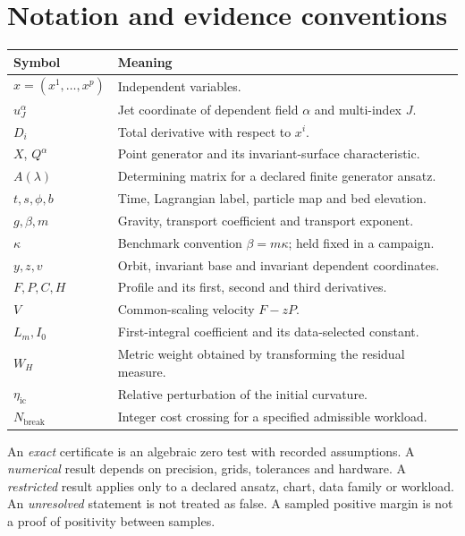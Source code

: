 \documentclass[12pt,a4paper,oneside]{report}
\numberwithin{equation}{chapter}
\begin{document}
\chapter*{Notation and evidence conventions}
\begin{longtable}{p{}p{}}
\toprule
Symbol & Meaning\\\midrule
$x=(x^1,\ldots,x^p)$ & Independent variables.\\
$u^\alpha_J$ & Jet coordinate of dependent field $\alpha$ and multi-index $J$.\\
$D_i$ & Total derivative with respect to $x^i$.\\
$X$, $Q^\alpha$ & Point generator and its invariant-surface characteristic.\\
$A(\lambda)$ & Determining matrix for a declared finite generator ansatz.\\
$t,s,\phi,b$ & Time, Lagrangian label, particle map and bed elevation.\\
$g,\beta,m$ & Gravity, transport coefficient and transport exponent.\\
$\kappa$ & Benchmark convention $\beta=m\kappa$; held fixed in a campaign.\\
$y,z,v$ & Orbit, invariant base and invariant dependent coordinates.\\
$F,P,C,H$ & Profile and its first, second and third derivatives.\\
$V$ & Common-scaling velocity $F-zP$.\\
$L_m,I_0$ & First-integral coefficient and its data-selected constant.\\
$W_H$ & Metric weight obtained by transforming the residual measure.\\
$\eta_{\mathrm{ic}}$ & Relative perturbation of the initial curvature.\\
$N_{\mathrm{break}}$ & Integer cost crossing for a specified admissible workload.\\
\bottomrule
\end{longtable}
An \emph{exact} certificate is an algebraic zero test with recorded assumptions.
A \emph{numerical} result depends on precision, grids, tolerances and hardware.
A \emph{restricted} result applies only to a declared ansatz, chart, data family
or workload. An \emph{unresolved} statement is not treated as false. A sampled
positive margin is not a proof of positivity between samples.

\tableofcontents
\listoftables
\listoffigures
\clearpage
{}
\end{document}
